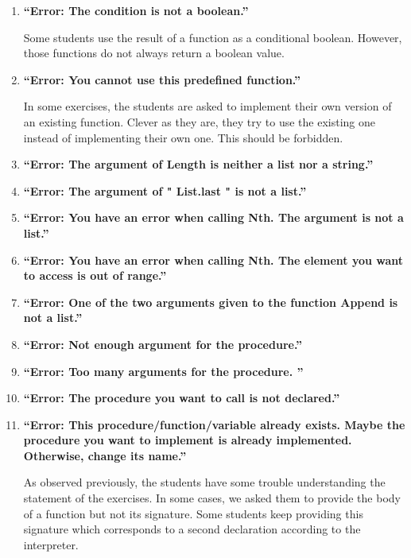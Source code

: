 \documentclass[11pt,a4paper,twoside,openright]{report}
\begin{document}
\begin{enumerate}
\item \textbf{\enquote{Error: The condition is not a boolean.}} 

Some students use the result of a function as a conditional boolean. However, 
those functions do not always return a boolean value.

\item \textbf{\enquote{Error: You cannot use this predefined function.}} 

In some exercises, the students are asked to implement their own version of an 
existing function. Clever as they are, they try to use the existing one instead 
of implementing their own one. This should be forbidden.

\item \textbf{\enquote{Error: The argument of Length is neither a list nor a string.}}

\item \textbf{\enquote{Error: The argument of " List.last " is not a list.}}

\item \textbf{\enquote{Error: You have an error when calling Nth. The argument is not 
a list.}}

\item \textbf{\enquote{Error: You have an error when calling Nth. The element you want 
to access is out of range.}}

\item \textbf{\enquote{Error: One of the two arguments given to the function Append is 
not a list.}}

\item \textbf{\enquote{Error: Not enough argument for the procedure.}}

\item \textbf{\enquote{Error: Too many arguments for the procedure. }}


\item \textbf{\enquote{Error: The procedure you want to call is not declared.}}

\item \textbf{\enquote{Error: This procedure/function/variable already exists. Maybe 
the procedure you want to implement is already implemented. Otherwise, change 
its name.}} 

As observed previously, the students have some trouble understanding the 
statement of the exercises. In some cases, we asked them to provide the body 
of a function but not its signature. Some students keep providing this 
signature which corresponds to a second declaration according to the 
interpreter.


\end{enumerate}
\end{document}
